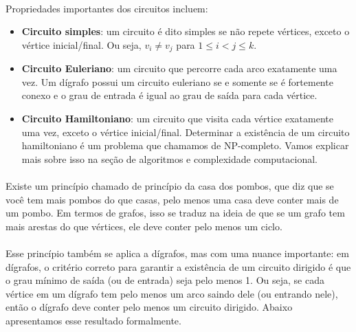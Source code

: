 \documentclass[12pt,a4paper]{article}
\begin{document}
\paragraph{}
Propriedades importantes dos circuitos incluem:
\begin{itemize}
    \item \textbf{Circuito simples}: um circuito é dito simples se não repete vértices, exceto o vértice inicial/final. Ou seja, \(v_i \neq v_j\) para \(1 \leq i < j \leq k\).
    \item \textbf{Circuito Euleriano}: um circuito que percorre cada arco exatamente uma vez. Um dígrafo possui um circuito euleriano se e somente se é fortemente conexo e o grau de entrada é igual ao grau de saída para cada vértice.
    \item \textbf{Circuito Hamiltoniano}: um circuito que visita cada vértice exatamente uma vez, exceto o vértice inicial/final. Determinar a existência de um circuito hamiltoniano é um problema que chamamos de NP-completo. Vamos explicar mais sobre isso na seção de algoritmos e complexidade computacional.
\end{itemize}       

\paragraph{}
Existe um princípio chamado de princípio da casa dos pombos, que diz que se você tem mais pombos do que casas, pelo menos uma casa deve conter mais de um pombo. Em termos de grafos, isso se traduz na ideia de que se um grafo tem mais arestas do que vértices, ele deve conter pelo menos um ciclo.

\paragraph{}
Esse princípio também se aplica a dígrafos, mas com uma nuance importante: em dígrafos, o critério correto para garantir a existência de um circuito dirigido é que o grau mínimo de saída (ou de entrada) seja pelo menos 1. Ou seja, se cada vértice em um dígrafo tem pelo menos um arco saindo dele (ou entrando nele), então o dígrafo deve conter pelo menos um circuito dirigido. Abaixo apresentamos esse resultado formalmente.
\end{document}
